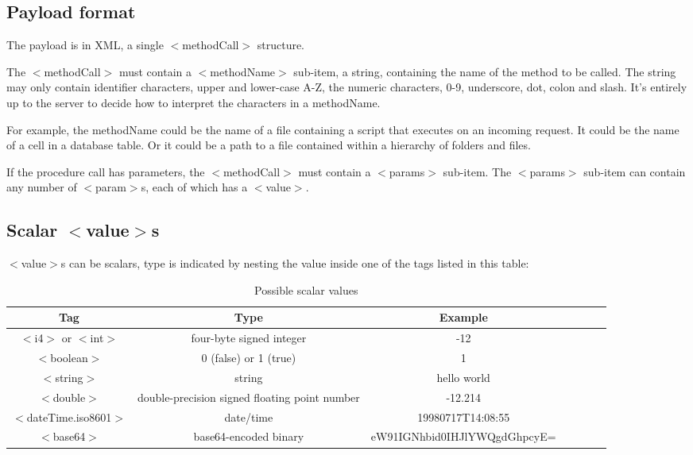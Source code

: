 \documentclass[10pt]{article}
\begin{document}
\subsection{Payload format}

The payload is in XML, a single $<$methodCall$>$ structure.

The $<$methodCall$>$ must contain a $<$methodName$>$ sub-item, a string, containing the name of the method to be called. The string may only contain identifier characters, upper and lower-case A-Z, the numeric characters, 0-9, underscore, dot, colon and slash. It's entirely up to the server to decide how to interpret the characters in a methodName.

For example, the methodName could be the name of a file containing a script that executes on an incoming request. It could be the name of a cell in a database table. Or it could be a path to a file contained within a hierarchy of folders and files.

If the procedure call has parameters, the $<$methodCall$>$ must contain a $<$params$>$ sub-item. The $<$params$>$ sub-item can contain any number of $<$param$>$s, each of which has a $<$value$>$.

\subsection{Scalar $<$value$>$s}

$<$value$>$s can be scalars, type is indicated by nesting the value inside one of the tags listed in this table:

\begin{table}
\caption{Possible scalar values}
\centering
\begin{tabular}{ccccccc}
\hline \hline
\textbf{Tag} & \textbf{Type} & \textbf{Example} \\
\hline
$<$i4$>$ or $<$int$>$ & four-byte signed integer & -12 \\
$<$boolean$>$ & 0 (false) or 1 (true) & 1 \\
$<$string$>$ & string & hello world \\
$<$double$>$ & double-precision signed floating point number & -12.214 \\
$<$dateTime.iso8601$>$ & date/time & 19980717T14:08:55 \\
$<$base64$>$ & base64-encoded binary & eW91IGNhbid0IHJlYWQgdGhpcyE= \\
\hline
\end{tabular}
\end{table}
\end{document}
